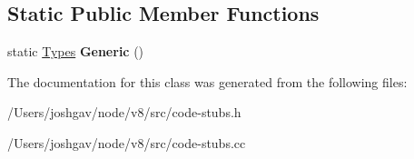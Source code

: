 \subsection*{Static Public Member Functions}
\begin{DoxyCompactItemize}
\item 
static \hyperlink{classv8_1_1internal_1_1_to_boolean_i_c_stub_1_1_types}{Types} {\bfseries Generic} ()\hypertarget{classv8_1_1internal_1_1_to_boolean_i_c_stub_1_1_types_a7f14f24219590809a04c779006060f6c}{}\label{classv8_1_1internal_1_1_to_boolean_i_c_stub_1_1_types_a7f14f24219590809a04c779006060f6c}

\end{DoxyCompactItemize}


The documentation for this class was generated from the following files\+:\begin{DoxyCompactItemize}
\item 
/\+Users/joshgav/node/v8/src/code-\/stubs.\+h\item 
/\+Users/joshgav/node/v8/src/code-\/stubs.\+cc\end{DoxyCompactItemize}

